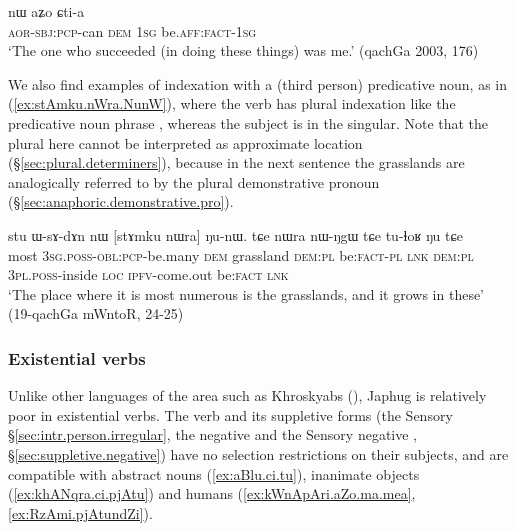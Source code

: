 \begin{exe}
\ex \label{ex:pWkWcha.nW}
\gll [pɯ-kɯ-cʰa] nɯ aʑo ɕti-a \\
\textsc{aor}-\textsc{sbj}:\textsc{pcp}-can \textsc{dem} \textsc{1sg} be.\textsc{aff}:\textsc{fact}-\textsc{1sg} \\
\glt `The one who succeeded (in doing these things) was me.' (qachGa 2003, 176)
\end{exe}

We also find examples of indexation with a (third person) predicative noun, as in (\ref{ex:stAmku.nWra.NunW}), where the verb has plural indexation like the predicative noun phrase , whereas the subject is in the singular. Note that the plural  here cannot be interpreted as approximate location (§\ref{sec:plural.determiners}), because in the next sentence the grasslands are analogically referred to by the plural demonstrative pronoun  (§\ref{sec:anaphoric.demonstrative.pro}).

\begin{exe}
\ex \label{ex:stAmku.nWra.NunW}
\gll  stu ɯ-sɤ-dɤn nɯ [stɤmku nɯra] ŋu-nɯ. tɕe nɯra nɯ-ŋgɯ tɕe tu-ɬoʁ ŋu tɕe \\
most \textsc{3sg}.\textsc{poss}-\textsc{obl}:\textsc{pcp}-be.many \textsc{dem} grassland \textsc{dem}:\textsc{pl} be:\textsc{fact}-\textsc{pl} \textsc{lnk} \textsc{dem}:\textsc{pl} \textsc{3pl}.\textsc{poss}-inside \textsc{loc} \textsc{ipfv}-come.out be:\textsc{fact} \textsc{lnk} \\
\glt `The place where it is most numerous is the grasslands, and it grows in these' (19-qachGa mWntoR, 24-25)
\end{exe}

\subsubsection{Existential verbs} \label{sec:existential.basic}
Unlike other languages of the area such as Khroskyabs (\citealt[250--252]{lai17khroskyabs}), Japhug is relatively poor in existential verbs. The verb  and its suppletive forms (the Sensory  §\ref{sec:intr.person.irregular}, the negative  and the Sensory negative ,  §\ref{sec:suppletive.negative}) have no selection restrictions on their  subjects, and are compatible  with abstract nouns (\ref{ex:aBlu.ci.tu}), inanimate objects (\ref{ex:khANqra.ci.pjAtu}) and  humans (\ref{ex:kWnApAri.aZo.ma.mea}, \ref{ex:RzAmi.pjAtundZi}).

